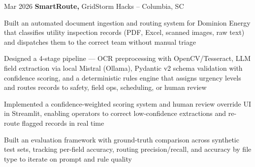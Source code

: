 \begin{twocolentry}{
    Mar 2026
}
    \textbf{SmartRoute,}
    GridStorm Hacks -- Columbia, SC
\end{twocolentry}
\vspace{0.06cm}
\begin{onecolentry}
    \begin{highlights}
        \item Built an automated document ingestion and routing system for Dominion Energy that classifies utility inspection records (PDF, Excel, scanned images, raw text) and dispatches them to the correct team without manual triage
        \item Designed a 4-stage pipeline --- OCR preprocessing with OpenCV/Tesseract, LLM field extraction via local Mistral (Ollama), Pydantic v2 schema validation with confidence scoring, and a deterministic rules engine that assigns urgency levels and routes records to safety, field ops, scheduling, or human review
        \item Implemented a confidence-weighted scoring system and human review override UI in Streamlit, enabling operators to correct low-confidence extractions and re-route flagged records in real time
        \item Built an evaluation framework with ground-truth comparison across synthetic test sets, tracking per-field accuracy, routing precision/recall, and accuracy by file type to iterate on prompt and rule quality
    \end{highlights}
\end{onecolentry}

